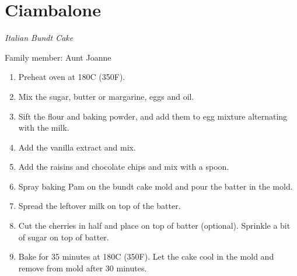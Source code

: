 \chapter{Ciambalone}
\label{ch:ciambalone}
\textit{Italian Bundt Cake}

Family member: Aunt Joanne




\begin{enumerate}
    \item Preheat oven at 180\degree C (350\degree F).
    \item Mix the sugar, butter or margarine, eggs and oil.
    \item Sift the flour and baking powder, and add them to egg mixture alternating with the milk.
    \item Add the vanilla extract and mix.
    \item Add the raisins and chocolate chips and mix with a spoon.
    \item Spray baking Pam on the bundt cake mold and pour the batter in the mold.
    \item Spread the leftover milk on top of the batter.
    \item Cut the cherries in half and place on top of batter (optional). Sprinkle a bit of sugar on top of batter.
    \item Bake for 35 minutes at 180\degree C (350\degree F). Let the cake cool in the mold and remove from mold after 30 minutes.
\end{enumerate}

